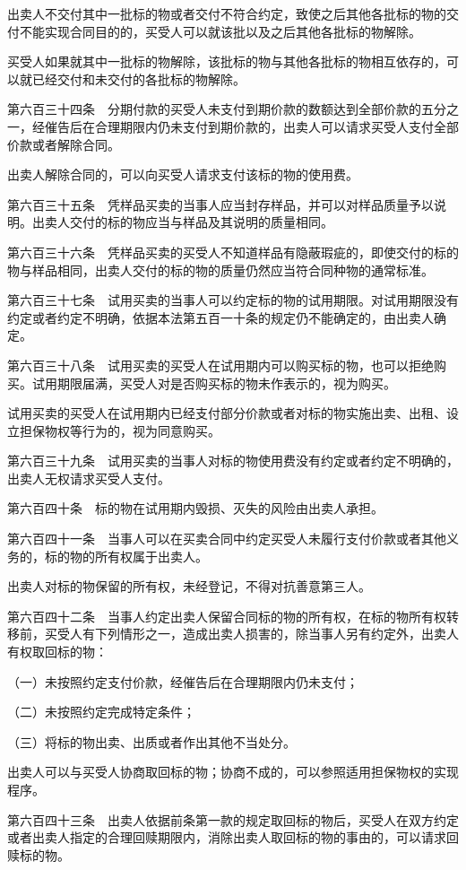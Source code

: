 \documentclass[UTF8,12pt,a4paper]{ctexbook}
\begin{document}
出卖人不交付其中一批标的物或者交付不符合约定，致使之后其他各批标的物的交付不能实现合同目的的，买受人可以就该批以及之后其他各批标的物解除。

买受人如果就其中一批标的物解除，该批标的物与其他各批标的物相互依存的，可以就已经交付和未交付的各批标的物解除。

第六百三十四条　分期付款的买受人未支付到期价款的数额达到全部价款的五分之一，经催告后在合理期限内仍未支付到期价款的，出卖人可以请求买受人支付全部价款或者解除合同。

出卖人解除合同的，可以向买受人请求支付该标的物的使用费。

第六百三十五条　凭样品买卖的当事人应当封存样品，并可以对样品质量予以说明。出卖人交付的标的物应当与样品及其说明的质量相同。

第六百三十六条　凭样品买卖的买受人不知道样品有隐蔽瑕疵的，即使交付的标的物与样品相同，出卖人交付的标的物的质量仍然应当符合同种物的通常标准。

第六百三十七条　试用买卖的当事人可以约定标的物的试用期限。对试用期限没有约定或者约定不明确，依据本法第五百一十条的规定仍不能确定的，由出卖人确定。

第六百三十八条　试用买卖的买受人在试用期内可以购买标的物，也可以拒绝购买。试用期限届满，买受人对是否购买标的物未作表示的，视为购买。

试用买卖的买受人在试用期内已经支付部分价款或者对标的物实施出卖、出租、设立担保物权等行为的，视为同意购买。

第六百三十九条　试用买卖的当事人对标的物使用费没有约定或者约定不明确的，出卖人无权请求买受人支付。

第六百四十条　标的物在试用期内毁损、灭失的风险由出卖人承担。

第六百四十一条　当事人可以在买卖合同中约定买受人未履行支付价款或者其他义务的，标的物的所有权属于出卖人。

出卖人对标的物保留的所有权，未经登记，不得对抗善意第三人。

第六百四十二条　当事人约定出卖人保留合同标的物的所有权，在标的物所有权转移前，买受人有下列情形之一，造成出卖人损害的，除当事人另有约定外，出卖人有权取回标的物：

（一）未按照约定支付价款，经催告后在合理期限内仍未支付；

（二）未按照约定完成特定条件；

（三）将标的物出卖、出质或者作出其他不当处分。

出卖人可以与买受人协商取回标的物；协商不成的，可以参照适用担保物权的实现程序。

第六百四十三条　出卖人依据前条第一款的规定取回标的物后，买受人在双方约定或者出卖人指定的合理回赎期限内，消除出卖人取回标的物的事由的，可以请求回赎标的物。
\end{document}
